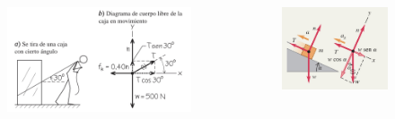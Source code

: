 \begin{frame}
\begin{columns}
    \begin{figure}
        \centering
        \includegraphics[width=1\linewidth]{figures/diagrama5.jpg}
    \end{figure}

    \begin{figure}
        \centering
        \includegraphics[width=1\linewidth]{figures/diagrama6.jpg}
    \end{figure}
\end{columns}
    
\end{frame}

